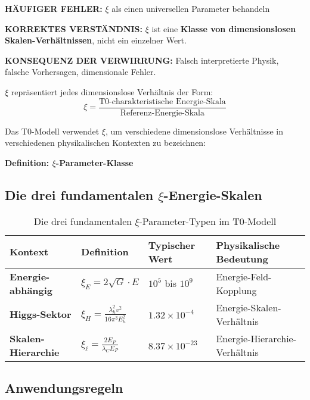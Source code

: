 \documentclass[12pt,a4paper]{article}
\begin{document}
	\begin{tcolorbox}[colback=red!10!white,colframe=red!75!black,title=KRITISCHE WARNUNG: $\xi$-Parameter-Verwirrung]
		\textbf{HÄUFIGER FEHLER:} $\xi$ als einen universellen Parameter behandeln
		
		\textbf{KORREKTES VERSTÄNDNIS:} $\xi$ ist eine \textbf{Klasse von dimensionslosen Skalen-Verhältnissen}, nicht ein einzelner Wert.
		
		\textbf{KONSEQUENZ DER VERWIRRUNG:} Falsch interpretierte Physik, falsche Vorhersagen, dimensionale Fehler.
		
		$\xi$ repräsentiert jedes dimensionslose Verhältnis der Form:
		\begin{equation}
			\xi = \frac{\text{T0-charakteristische Energie-Skala}}{\text{Referenz-Energie-Skala}}
		\end{equation}
		
		Das T0-Modell verwendet $\xi$, um verschiedene dimensionslose Verhältnisse in verschiedenen physikalischen Kontexten zu bezeichnen:
		
		\textbf{Definition: $\xi$-Parameter-Klasse}
	\end{tcolorbox}	
	
	\subsection{Die drei fundamentalen $\xi$-Energie-Skalen}
	
	\begin{table}[htbp]
		\centering
		\begin{tabular}{|p{3cm}|p{4cm}|p{3cm}|p{4cm}|}
			\hline
			\textbf{Kontext} & \textbf{Definition} & \textbf{Typischer Wert} & \textbf{Physikalische Bedeutung} \\
			\hline
			\textbf{Energie-abhängig} & $\xi_E = 2\sqrt{G} \cdot E$ & $10^5$ bis $10^9$ & Energie-Feld-Kopplung \\
			\hline
			\textbf{Higgs-Sektor} & $\xi_H = \frac{\lambda_h^2 v^2}{16\pi^3 E_h^2}$ & $1.32 \times 10^{-4}$ & Energie-Skalen-Verhältnis \\
			\hline
			\textbf{Skalen-Hierarchie} & $\xi_\ell = \frac{2E_P}{\lambda_C E_P}$ & $8.37 \times 10^{-23}$ & Energie-Hierarchie-Verhältnis \\
			\hline
		\end{tabular}
		\caption{Die drei fundamentalen $\xi$-Parameter-Typen im T0-Modell}
		\label{tab:xi_hierarchy}
	\end{table}
	
	\subsection{Anwendungsregeln}
	
\end{document}
